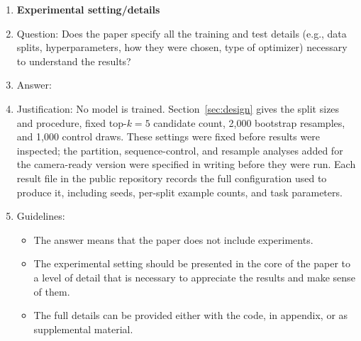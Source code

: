 \begin{enumerate}
\item {\bf Experimental setting/details}
    \item[] Question: Does the paper specify all the training and test details (e.g., data splits, hyperparameters, how they were chosen, type of optimizer) necessary to understand the results?
    \item[] Answer: \answerYes{}
    \item[] Justification: No model is trained. Section~\ref{sec:design} gives the split sizes and procedure, fixed top-$k=5$ candidate count, 2{,}000 bootstrap resamples, and 1{,}000 control draws. These settings were fixed before results were inspected; the partition, sequence-control, and resample analyses added for the camera-ready version were specified in writing before they were run. Each result file in the public repository records the full configuration used to produce it, including seeds, per-split example counts, and task parameters.
    \item[] Guidelines:
    \begin{itemize}
        \item The answer \answerNA{} means that the paper does not include experiments.
        \item The experimental setting should be presented in the core of the paper to a level of detail that is necessary to appreciate the results and make sense of them.
        \item The full details can be provided either with the code, in appendix, or as supplemental material.
    \end{itemize}


\end{enumerate}
